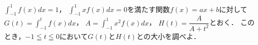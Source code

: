 \documentclass[../../main.tex]{subfiles}
\begin{document}
$\displaystyle\int_{-1}^1f(x)dx=1$，
$\displaystyle\int_{-1}^1xf(x)dx=0$を満たす関数$f(x)=ax+b$に対して
$\displaystyle G(t)=\int_{-1}^tf(x)dx$，
$\displaystyle A=\int_{-1}^1x^2f(x)dx$，
$\displaystyle H(t)=\dfrac{A}{A+t^2}$とおく．
このとき，$-1 \leqq t \leqq 0$において$G(t)$と$H(t)$との大小を調べよ．
\end{document}
